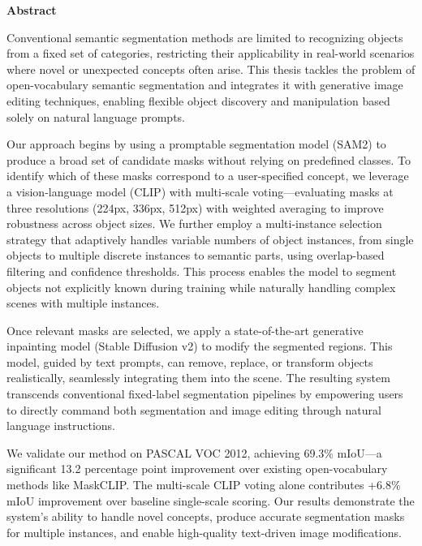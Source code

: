 \vspace{2.5cm}

{\Large \bfseries Abstract}

\vspace{1.5cm}

Conventional semantic segmentation methods are limited to recognizing objects from a fixed set of categories, restricting their applicability in real-world scenarios where novel or unexpected concepts often arise. This thesis tackles the problem of open-vocabulary semantic segmentation and integrates it with generative image editing techniques, enabling flexible object discovery and manipulation based solely on natural language prompts.

Our approach begins by using a promptable segmentation model (SAM2) to produce a broad set of candidate masks without relying on predefined classes. To identify which of these masks correspond to a user-specified concept, we leverage a vision-language model (CLIP) with multi-scale voting—evaluating masks at three resolutions (224px, 336px, 512px) with weighted averaging to improve robustness across object sizes. We further employ a multi-instance selection strategy that adaptively handles variable numbers of object instances, from single objects to multiple discrete instances to semantic parts, using overlap-based filtering and confidence thresholds. This process enables the model to segment objects not explicitly known during training while naturally handling complex scenes with multiple instances.

Once relevant masks are selected, we apply a state-of-the-art generative inpainting model (Stable Diffusion v2) to modify the segmented regions. This model, guided by text prompts, can remove, replace, or transform objects realistically, seamlessly integrating them into the scene. The resulting system transcends conventional fixed-label segmentation pipelines by empowering users to directly command both segmentation and image editing through natural language instructions.

We validate our method on PASCAL VOC 2012, achieving 69.3\% mIoU—a significant 13.2 percentage point improvement over existing open-vocabulary methods like MaskCLIP. The multi-scale CLIP voting alone contributes +6.8\% mIoU improvement over baseline single-scale scoring. Our results demonstrate the system's ability to handle novel concepts, produce accurate segmentation masks for multiple instances, and enable high-quality text-driven image modifications.